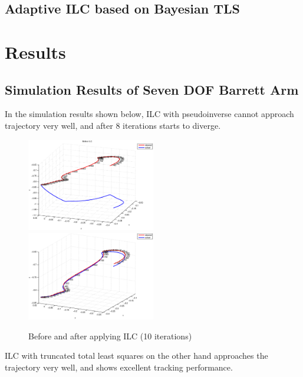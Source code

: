 \documentclass[10pt,a4paper]{article}
\begin{document}
%
\subsection{Adaptive ILC based on Bayesian TLS}\label{adaptiveILC}
%


\section{Results}\label{results}

%
\subsection{Simulation Results of Seven DOF Barrett Arm}
%
In the simulation results shown below, ILC with pseudoinverse cannot approach trajectory very well, and after 8 iterations starts to diverge.
\begin{figure}
\centering
\includegraphics[width=0.5\textwidth]{beforeILC.eps}%
\includegraphics[width=0.5\textwidth]{afterILCPseudoInv.eps}		
\caption{Before and after applying ILC (10 iterations)}
\end{figure}
%
ILC with truncated total least squares on the other hand approaches the trajectory very well, and shows excellent tracking performance.
%
\end{document}
